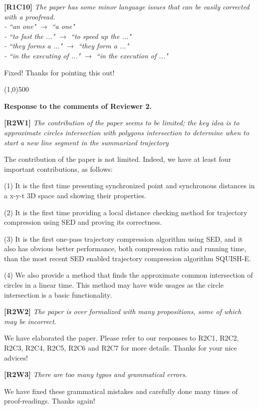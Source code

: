 \documentclass{letter}
\begin{document}
\textbf{[R1C10]} \emph{The paper has some minor language issues that can be easily corrected with a proofread.\\
- ``an one" $\rightarrow$ ``a one" \\
- ``to fast the ..." $\rightarrow$ ``to speed up the ..." \\
- ``they forms a ..." $\rightarrow$ ``they form a ..."	\\
- ``in the executing of ..." $\rightarrow$ ``in the execution of ..."
}


Fixed! Thanks for pointing this out!

\line(1,0){500}

\textbf{Response to the comments of Reviewer 2.}

\textbf{[R2W1]} \emph{The contribution of the paper seems to be limited; the key idea is to approximate circles intersection with polygons intersection to determine when to start a new line segment in the summarized trajectory}

The contribution of the paper is not limited. Indeed, we have at least four important contributions, as follows:

(1) It is the first time presenting synchronized point and synchronous distances in a x-y-t 3D space and showing their properties.

(2) It is the first time providing a local distance checking method for trajectory compression using SED and proving its correctness.

(3) It is the first one-pass trajectory compression algorithm using SED, and it also has obvious better performance, both compression ratio and running time, than the most recent SED enabled trajectory compression algorithm SQUISH-E. 

(4) We also provide a method that finds the approximate common intersection of circles in a linear time. This method may have wide usages as the circle intersection is a basic functionality.

\textbf{[R2W2]} \emph{The paper is over formalized with many propositions, some of which may be incorrect.}

We have elaborated the paper. Please refer to our responses to R2C1, R2C2, R2C3, R2C4, R2C5, R2C6 and R2C7 for more details. Thanks for your nice advices!

\textbf{[R2W3]} \emph{There are too many typos and grammatical errors.}

We have fixed these grammatical mistakes and carefully done many times of proof-readings. Thanks again!
\end{document}
